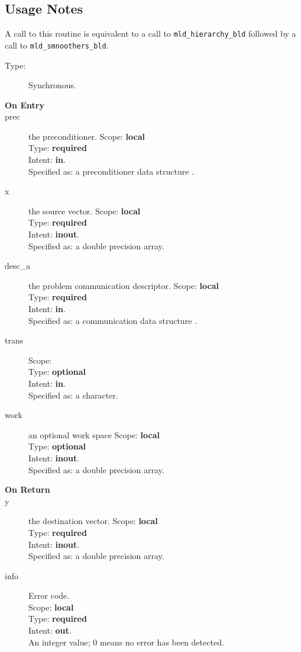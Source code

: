 \subsection*{Usage Notes}
A call to this routine is equivalent to a call to
\verb|mld_hierarchy_bld| followed by a call to \verb|mld_smnoothers_bld|.




\begin{description}
\item[Type:] Synchronous.
\item[\bf On Entry]
\item[prec] the preconditioner.
Scope: {\bf local} \\
Type: {\bf required}\\
Intent: {\bf in}.\\
Specified as: a preconditioner data structure \precdata.
\item[x] the source vector.
Scope: {\bf local} \\
Type: {\bf required}\\
Intent: {\bf inout}.\\
Specified as: a double precision array.
\item[desc\_a] the problem communication descriptor.
Scope: {\bf local} \\
Type: {\bf required}\\
Intent: {\bf in}.\\
Specified as: a communication data structure \descdata.
\item[trans] 
Scope: {\bf } \\
Type: {\bf optional}\\
Intent: {\bf in}.\\
Specified as: a character.
\item[work] an optional work space
Scope: {\bf local} \\
Type: {\bf optional}\\
Intent: {\bf inout}.\\
Specified as: a double precision array.
\end{description}

\begin{description}
\item[\bf On Return]
\item[y] the destination vector.
Scope: {\bf local} \\
Type: {\bf required}\\
Intent: {\bf inout}.\\
Specified as: a double precision array.
\item[info] Error code.\\
Scope: {\bf local} \\
Type: {\bf required} \\
Intent: {\bf out}.\\
An integer value; 0 means no error has been detected. 
\end{description}



